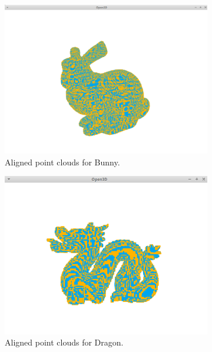 \documentclass{article}
\begin{document}
\begin{figure}[h!]
    \begin{subfigure}[b]{0.3\textwidth}
        \includegraphics[width=\textwidth]{bunny2.png}
        \caption{Aligned point clouds for Bunny.}
    \end{subfigure}
    \begin{subfigure}[b]{0.3\textwidth}
        \includegraphics[width=\textwidth]{dragon2.png}
        \caption{Aligned point clouds for Dragon.}
    \end{subfigure}
    \begin{subfigure}[b]{0.3\textwidth}

\end{subfigure}
\end{figure}
\end{document}

